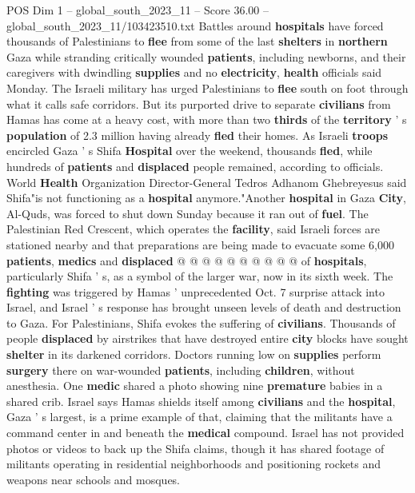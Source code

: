 \begin{textsample}{POS Dim 1 – global\_south\_2023\_11 – Score 36.00 – global\_south\_2023\_11/103423510.txt}  \label{ex:f1_pos_125}
Battles around \textbf{hospitals} have forced thousands of Palestinians to \textbf{flee} from some of the last \textbf{shelters} in \textbf{northern} Gaza while stranding critically wounded \textbf{patients}, including newborns, and their caregivers with dwindling \textbf{supplies} and no \textbf{electricity}, \textbf{health} officials said Monday.
The Israeli military has urged Palestinians to \textbf{flee} south on foot through what it calls safe corridors.
But its purported drive to separate \textbf{civilians} from Hamas has come at a heavy cost, with more than two \textbf{thirds} of the \textbf{territory} ' s \textbf{population} of 2.3 million having already \textbf{fled} their homes.
As Israeli \textbf{troops} encircled Gaza ' s Shifa \textbf{Hospital} over the weekend, thousands \textbf{fled}, while hundreds of \textbf{patients} and \textbf{displaced} people remained, according to officials.
World \textbf{Health} Organization Director-General Tedros Adhanom Ghebreyesus said Shifa"is not functioning as a \textbf{hospital} anymore."Another \textbf{hospital} in Gaza \textbf{City}, Al-Quds, was forced to shut down Sunday because it ran out of \textbf{fuel}.
The Palestinian Red Crescent, which operates the \textbf{facility}, said Israeli forces are stationed nearby and that preparations are being made to evacuate some 6,000 \textbf{patients}, \textbf{medics} and \textbf{displaced} @ @ @ @ @ @ @ @ @ @ of \textbf{hospitals}, particularly Shifa ' s, as a symbol of the larger war, now in its sixth week.
The \textbf{fighting} was triggered by Hamas ' unprecedented Oct. 7 surprise attack into Israel, and Israel ' s response has brought unseen levels of death and destruction to Gaza.
For Palestinians, Shifa evokes the suffering of \textbf{civilians}.
Thousands of people \textbf{displaced} by airstrikes that have destroyed entire \textbf{city} blocks have sought \textbf{shelter} in its darkened corridors.
Doctors running low on \textbf{supplies} perform \textbf{surgery} there on war-wounded \textbf{patients}, including \textbf{children}, without anesthesia.
One \textbf{medic} shared a photo showing nine \textbf{premature} babies in a shared crib.
Israel says Hamas shields itself among \textbf{civilians} and the \textbf{hospital}, Gaza ' s largest, is a prime example of that, claiming that the militants have a command center in and beneath the \textbf{medical} compound.
Israel has not provided photos or videos to back up the Shifa claims, though it has shared footage of militants operating in residential neighborhoods and positioning rockets and weapons near schools and mosques.

\end{textsample}
